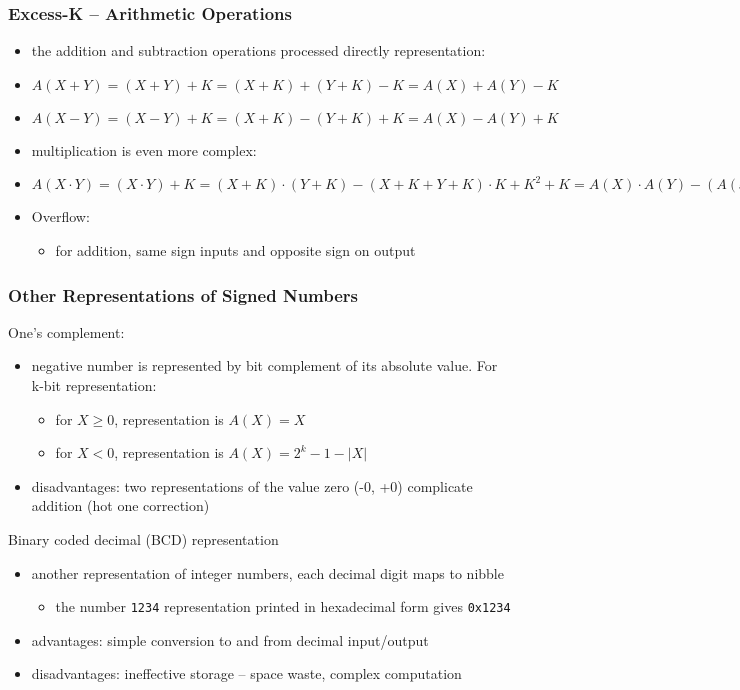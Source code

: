 \documentclass{beamer}
\begin{document}
\begin{frame}
\frametitle{Excess-K -- Arithmetic Operations}

\begin{itemize}
\item the addition and subtraction operations processed directly representation:
\item $A ( X + Y )=( X + Y )+ K =( X + K ) + (Y + K ) - K = A ( X )+ A (Y ) -K$
\item $A ( X - Y )=( X - Y )+ K =( X + K ) - (Y +K )+K = A ( X ) - A (Y )+K$
\item multiplication is even more complex:
\item $A ( X \cdot Y )=( X \cdot Y )+K =( X + K )\cdot(Y + K )-( X + K +Y +K )\cdot K + K^2+ K
= A ( X )\cdot A (Y ) - ( A ( x)+ A ( y ))\cdot K + K^2 +K$
\end{itemize}
\bigskip
\begin{itemize}
\item Overflow:
\begin{itemize}
\item for addition, same sign inputs and opposite sign on output
\end{itemize}
\end{itemize}
\end{frame}


\begin{frame}
\frametitle{Other Representations of Signed Numbers}

One's complement:
\begin{itemize}
\item negative number is represented by bit complement of its absolute value. For k-bit representation:
\begin{itemize}
\item for $X\ge0$, representation is $A(X) = X$
\item for $X<0$, representation is $A(X) = 2^k-1-|X|$
\end{itemize}
\item disadvantages: two representations of the value zero (-0, +0) complicate addition (hot one correction)
\end{itemize}
\bigskip
Binary coded decimal (BCD) representation
\begin{itemize}
\item another representation of integer numbers, each decimal digit maps to nibble 
\begin{itemize}
\item the number \texttt{1234} representation printed in hexadecimal form gives \texttt{0x1234}
\end{itemize}
\item advantages: simple conversion to and from decimal input/output
\item disadvantages: ineffective storage -- space waste, complex computation
\end{itemize}
\end{frame}
\end{document}
